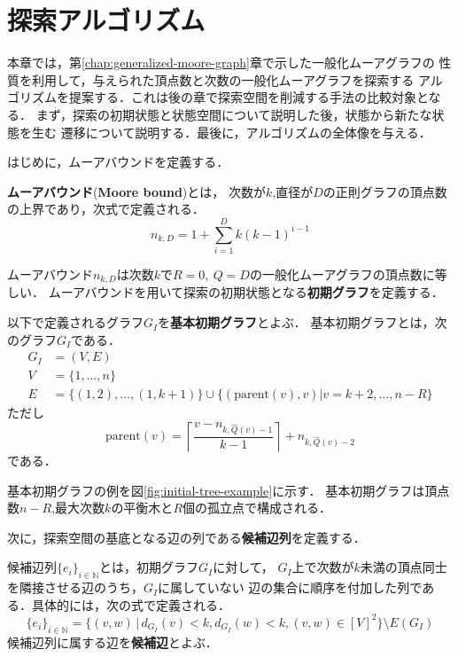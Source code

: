 
\chapter{探索アルゴリズム}
\label{chap:basic-algorithm}
本章では，第\ref{chap:generalized-moore-graph}章で示した一般化ムーアグラフの
性質を利用して，与えられた頂点数と次数の一般化ムーアグラフを探索する
アルゴリズムを提案する．これは後の章で探索空間を削減する手法の比較対象となる．
まず，探索の初期状態と状態空間について説明した後，状態から新たな状態を生む
遷移について説明する．最後に，アルゴリズムの全体像を与える．

はじめに，ムーアバウンドを定義する．
\begin{definition}\rm
  \textbf{ムーアバウンド}(\textbf{Moore bound})とは，
  次数が$k$,直径が$D$の正則グラフの頂点数の上界であり，次式で定義される．
  \begin{equation}
    n_{k,D} = 1 + \sum_{i=1}^Dk(k-1)^{i-1}
  \end{equation}
\end{definition}

ムーアバウンド$n_{k,D}$は次数$k$で$R=0,\ Q=D$の一般化ムーアグラフの頂点数に等しい．
ムーアバウンドを用いて探索の初期状態となる\textbf{初期グラフ}を定義する．

\begin{definition}\rm
  \label{def:basic-initial-graph}
  以下で定義されるグラフ$G_I$を\textbf{基本初期グラフ}とよぶ．
  基本初期グラフとは，次のグラフ$G_I$である．
  \begin{equation}
    \begin{aligned}
      \label{eq:basic-initial-graph}
      G_I&=(V,E) \\
      V&=\{1,\ldots,n\} \\
      E&=\{(1,2),\ldots,(1,k+1)\}\cup
      \{(\text{parent}(v),v)|v=k+2,\ldots,n-R\}
    \end{aligned}
  \end{equation}
  ただし
  \[\text{parent}(v)=
  \left\lceil\frac{v-n_{k,\hat{Q}(v)-1}}{k-1}\right\rceil+n_{k,\hat{Q}(v)-2}\]
  である．
\end{definition}

基本初期グラフの例を図\ref{fig:initial-tree-example}に示す．
基本初期グラフは頂点数$n-R$,最大次数$k$の平衡木と$R$個の孤立点で構成される．

次に，探索空間の基底となる辺の列である\textbf{候補辺列}を定義する．

\begin{definition}\rm
  \label{def:candidate-edges}
  候補辺列$\{e_i\}_{i\in\mathbb{N}}$とは，初期グラフ$G_I$に対して，
  $G_I$上で次数が$k$未満の頂点同士を隣接させる辺のうち，$G_I$に属していない
  辺の集合に順序を付加した列である．具体的には，次の式で定義される．
  \begin{equation}
    \{e_i\}_{i\in\mathbb{N}} =
    \{(v,w)\,|\,d_{G_I}(v)<k,d_{G_I}(w)<k,(v,w)\in[V]^2\}\setminus E(G_I)
  \end{equation}
  候補辺列に属する辺を\textbf{候補辺}とよぶ．
\end{definition}

